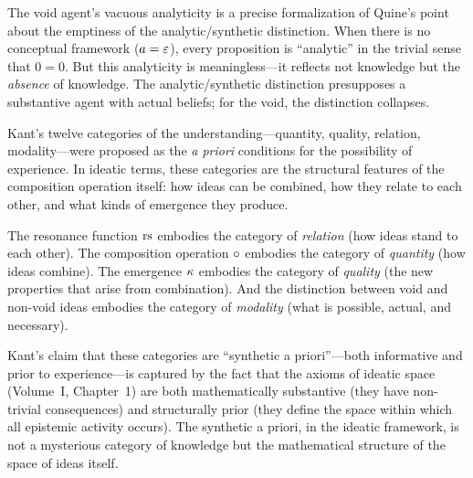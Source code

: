 \begin{interpretation}
The void agent's vacuous analyticity is a precise formalization of Quine's
point about the emptiness of the analytic/synthetic distinction. When there is
no conceptual framework ($a = \varepsilon$), every proposition is ``analytic'' in
the trivial sense that $0 = 0$. But this analyticity is meaningless---it
reflects not knowledge but the \emph{absence} of knowledge. The
analytic/synthetic distinction presupposes a substantive agent with actual
beliefs; for the void, the distinction collapses.
\end{interpretation}

\begin{remark}
Kant's twelve categories of the understanding---quantity, quality, relation,
modality---were proposed as the \emph{a priori} conditions for the possibility
of experience. In ideatic terms, these categories are the structural features
of the composition operation itself: how ideas can be combined, how they relate
to each other, and what kinds of emergence they produce.

The resonance function $\mathrm{rs}$ embodies the category of \emph{relation} (how ideas
stand to each other). The composition operation $\circ$ embodies the category
of \emph{quantity} (how ideas combine). The emergence $\kappa$ embodies the
category of \emph{quality} (the new properties that arise from combination).
And the distinction between void and non-void ideas embodies the category of
\emph{modality} (what is possible, actual, and necessary).

Kant's claim that these categories are ``synthetic a priori''---both informative
and prior to experience---is captured by the fact that the axioms of ideatic space
(Volume~I, Chapter~1) are both mathematically substantive (they have non-trivial
consequences) and structurally prior (they define the space within which all
epistemic activity occurs). The synthetic a priori, in the ideatic framework, is
not a mysterious category of knowledge but the mathematical structure of the
space of ideas itself.
\end{remark}

